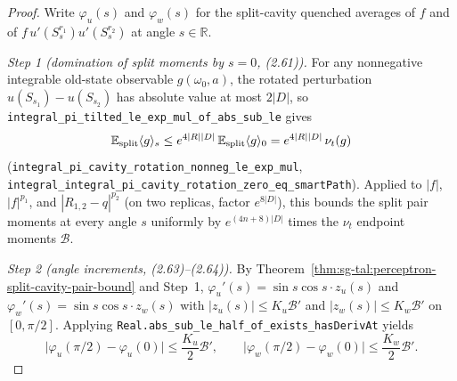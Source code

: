 \begin{proof}
  \leanok
Write $\varphi_u(s)$ and $\varphi_w(s)$ for the split-cavity quenched averages of $f$ and of $f\,u'(S_s^{r_1})u'(S_s^{r_2})$ at angle $s\in\mathbb R$.

\emph{Step 1 (domination of split moments by $s=0$, (2.61)).} For any nonnegative integrable old-state observable $g(\omega_0,a)$, the rotated
perturbation $u(S_{s_1})-u(S_{s_2})$ has absolute value at most $2|D|$, so \texttt{integral\_pi\_tilted\_le\_exp\_mul\_of\_abs\_sub\_le} gives
\[
 \mathbb E_{\rm split}\langle g\rangle_{s}\le e^{4|R||D|}\,\mathbb E_{\rm split}\langle g\rangle_{0}
 =e^{4|R||D|}\,\nu_t(g)
\]
(\texttt{integral\_pi\_cavity\_rotation\_nonneg\_le\_exp\_mul}, \texttt{integral\_integral\_pi\_cavity\_rotation\_zero\_eq\_smartPath}). Applied to
$|f|$, $|f|^{p_1}$, and $|R_{1,2}-q|^{p_2}$ (on two replicas, factor $e^{8|D|}$), this bounds the split pair moments at every angle $s$ uniformly
by $e^{(4n+8)|D|}$ times the $\nu_t$ endpoint moments $\mathcal B$.

\emph{Step 2 (angle increments, (2.63)--(2.64)).} By Theorem~\ref{thm:sg-tal:perceptron-split-cavity-pair-bound} and Step~1, $\varphi_u'(s)=\sin s\cos s\cdot z_u(s)$
and $\varphi_w'(s)=\sin s\cos s\cdot z_w(s)$ with $|z_u(s)|\le K_u\mathcal B'$ and $|z_w(s)|\le K_w\mathcal B'$ on $[0,\pi/2]$. Applying
\texttt{Real.abs\_sub\_le\_half\_of\_exists\_hasDerivAt} yields
\[
 \bigl|\varphi_u(\pi/2)-\varphi_u(0)\bigr|\le\frac{K_u}{2}\mathcal B',\qquad
 \bigl|\varphi_w(\pi/2)-\varphi_w(0)\bigr|\le\frac{K_w}{2}\mathcal B'.
\]


\end{proof}
